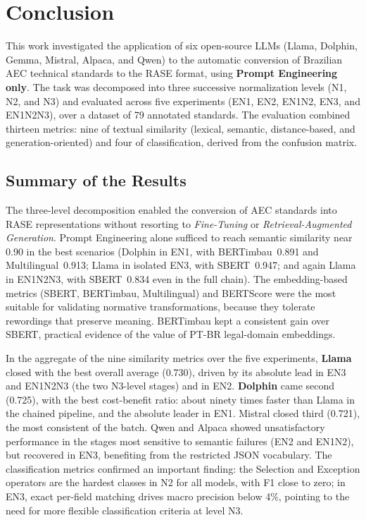 \documentclass[a4paper,fleqn]{cas-sc}
\begin{document}
\section{Conclusion}\label{sec:conclusion}

This work investigated the application of six open-source LLMs (Llama, Dolphin, Gemma, Mistral, Alpaca, and Qwen) to the automatic conversion of Brazilian AEC technical standards to the RASE format, using \textbf{Prompt Engineering only}. The task was decomposed into three successive normalization levels (N1, N2, and N3) and evaluated across five experiments (EN1, EN2, EN1N2, EN3, and EN1N2N3), over a dataset of 79 annotated standards. The evaluation combined thirteen metrics: nine of textual similarity (lexical, semantic, distance-based, and generation-oriented) and four of classification, derived from the confusion matrix.

\subsection{Summary of the Results}

The three-level decomposition enabled the conversion of AEC standards into RASE representations without resorting to \textit{Fine-Tuning} or \textit{Retrieval-Augmented Generation}. Prompt Engineering alone sufficed to reach semantic similarity near 0.90 in the best scenarios (Dolphin in EN1, with BERTimbau~0.891 and Multilingual~0.913; Llama in isolated EN3, with SBERT~0.947; and again Llama in EN1N2N3, with SBERT~0.834 even in the full chain). The embedding-based metrics (SBERT, BERTimbau, Multilingual) and BERTScore were the most suitable for validating normative transformations, because they tolerate rewordings that preserve meaning. BERTimbau kept a consistent gain over SBERT, practical evidence of the value of PT-BR legal-domain embeddings.

In the aggregate of the nine similarity metrics over the five experiments, \textbf{Llama} closed with the best overall average (0.730), driven by its absolute lead in EN3 and EN1N2N3 (the two N3-level stages) and in EN2. \textbf{Dolphin} came second (0.725), with the best cost-benefit ratio: about ninety times faster than Llama in the chained pipeline, and the absolute leader in EN1. Mistral closed third (0.721), the most consistent of the batch. Qwen and Alpaca showed unsatisfactory performance in the stages most sensitive to semantic failures (EN2 and EN1N2), but recovered in EN3, benefiting from the restricted JSON vocabulary. The classification metrics confirmed an important finding: the Selection and Exception operators are the hardest classes in N2 for all models, with F1 close to zero; in EN3, exact per-field matching drives macro precision below 4\%, pointing to the need for more flexible classification criteria at level N3.
\end{document}
